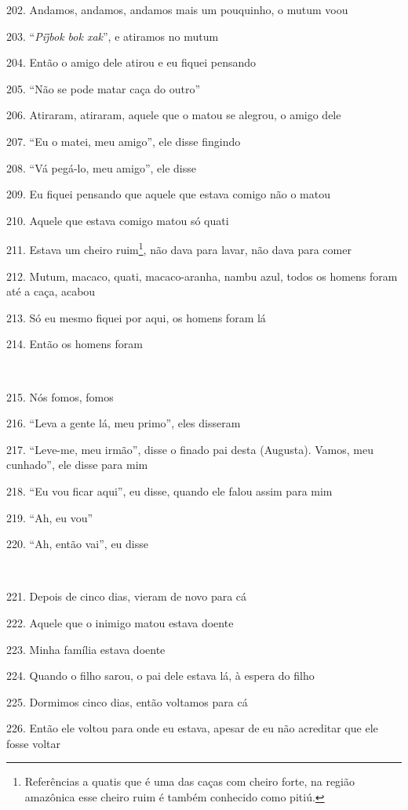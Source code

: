 202. Andamos, andamos, andamos mais um pouquinho, o mutum voou

203. ``\emph{Pij̃bok bok xak}'', e atiramos no mutum

204. Então o amigo dele atirou e eu fiquei pensando

205. ``Não se pode matar caça do outro''

206. Atiraram, atiraram, aquele que o matou se alegrou, o amigo dele

207. ``Eu o matei, meu amigo'', ele disse fingindo

208. ``Vá pegá-lo, meu amigo'', ele disse

209. Eu fiquei pensando que aquele que estava comigo não o matou

210. Aquele que estava comigo matou só quati

211. Estava um cheiro ruim\footnote{Referências a quatis que é uma das
  caças com cheiro forte, na região amazônica esse cheiro ruim é também
  conhecido como pitiú.}, não dava para lavar, não dava para comer

212. Mutum, macaco, quati, macaco-aranha, nambu azul, todos os homens
foram até a caça, acabou

213. Só eu mesmo fiquei por aqui, os homens foram lá

214. Então os homens foram

~

215. Nós fomos, fomos

216. ``Leva a gente lá, meu primo'', eles disseram

217. ``Leve-me, meu irmão'', disse o finado pai desta (Augusta).  Vamos,
meu cunhado'', ele disse para mim

218. ``Eu vou ficar aqui'', eu disse, quando ele falou assim para mim

219. ``Ah, eu vou''

220. ``Ah, então vai'', eu disse

~

221. Depois de cinco dias, vieram de novo para cá

222. Aquele que o inimigo matou estava doente

223. Minha família estava doente

224. Quando o filho sarou, o pai dele estava lá, à espera do filho

225. Dormimos cinco dias, então voltamos para cá

226. Então ele voltou para onde eu estava, apesar de eu não acreditar que
ele fosse voltar

